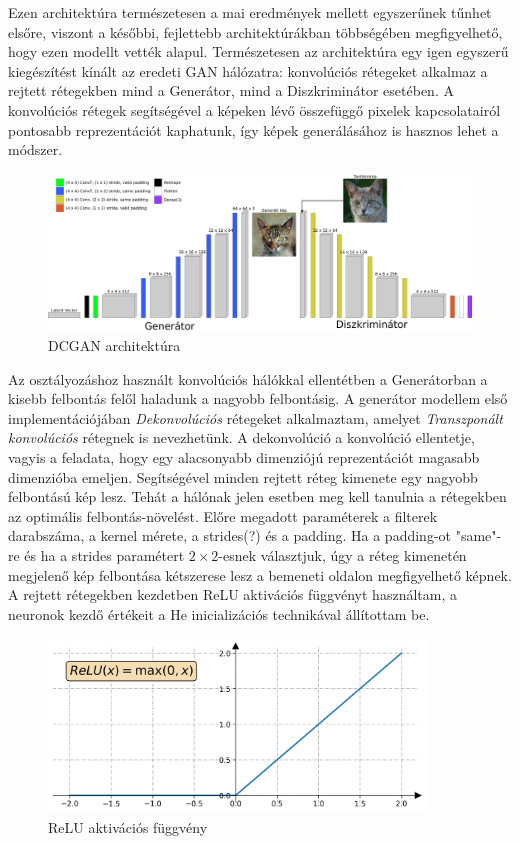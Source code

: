 
Ezen architektúra természetesen a mai eredmények mellett egyszerűnek tűnhet elsőre, viszont a későbbi, fejlettebb architektúrákban többségében megfigyelhető, hogy ezen modellt vették alapul. Természetesen az architektúra egy igen egyszerű kiegészítést kínált az eredeti GAN hálózatra: konvolúciós rétegeket alkalmaz a rejtett rétegekben mind a Generátor, mind a Diszkriminátor esetében. A konvolúciós rétegek segítségével a képeken lévő összefüggő pixelek kapcsolatairól pontosabb reprezentációt kaphatunk, így képek generálásához is hasznos lehet a módszer.

\begin{figure}[h]
\centering
\includegraphics[width=15cm]{images/DCGAN.png}
\caption{DCGAN architektúra}
\label{fig:dcgan}
\end{figure}


Az osztályozáshoz használt konvolúciós hálókkal ellentétben a Generátorban a kisebb felbontás felől haladunk a nagyobb felbontásig.
A generátor modellem első implementációjában \textit{Dekonvolúciós} rétegeket alkalmaztam, amelyet \textit{Transzponált konvolúciós} rétegnek is nevezhetünk. A dekonvolúció a konvolúció ellentetje, vagyis a feladata, hogy egy alacsonyabb dimenziójú reprezentációt magasabb dimenzióba emeljen. Segítségével minden rejtett réteg kimenete egy nagyobb felbontású kép lesz. Tehát a hálónak jelen esetben meg kell tanulnia a rétegekben az optimális felbontás-növelést. Előre megadott paraméterek a filterek darabszáma, a kernel mérete, a strides(?) és a padding. Ha a padding-ot "same"-re és ha a strides paramétert $2 \times 2$-esnek választjuk, úgy a réteg kimenetén megjelenő kép felbontása kétszerese lesz a bemeneti oldalon megfigyelhető képnek. A rejtett rétegekben kezdetben ReLU aktivációs függvényt használtam, a neuronok kezdő értékeit a He inicializációs technikával \cite{he2015delving} állítottam be.

\begin{figure}[h]
\centering
\includegraphics[width=10cm]{images/relu.png}
\caption{ReLU aktivációs függvény}
\label{fig:relu}
\end{figure}

